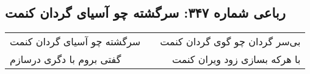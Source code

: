 \begin{center}
\section*{رباعی شماره ۳۴۷: سرگشته چو آسیای گردان کنمت}
\label{sec:0347}
\begin{longtable}{l p{0.5cm} r}
سرگشته چو آسیای گردان کنمت
&&
بی‌سر گردان چو گوی گردان کنمت
\\
گفتی بروم با دگری درسازم
&&
با هرکه بسازی زود ویران کنمت
\\
\end{longtable}
\end{center}
